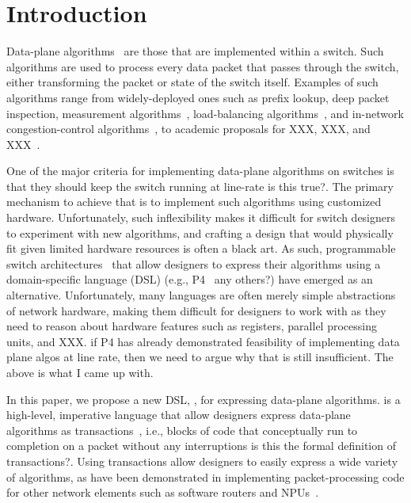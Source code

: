 \section{Introduction}
\label{s:intro}

Data-plane algorithms~\cite{cestan} are those that are implemented within 
a switch. Such algorithms are used to process every data packet that passes
through the switch, either transforming the packet or state of the switch itself.
Examples of such algorithms range from widely-deployed ones such
as prefix lookup, deep
packet inspection, measurement algorithms~\cite{minsketch}, load-balancing
algorithms~\cite{conga}, and in-network congestion-control algorithms~\cite{XXX},
to academic proposals for XXX, XXX, and XXX~\cite{minsketch, codel, pdq}.

One of the major criteria for implementing data-plane algorithms on switches 
is that they should keep the switch running at line-rate \ac{is this true?}.
The primary mechanism to achieve that is to implement such algorithms using 
customized hardware. Unfortunately, such inflexibility makes it difficult
for switch designers to experiment with new algorithms, and crafting a design
that would physically fit given limited hardware resources is often a black art.
As such, programmable switch architectures~\cite{flexpipe, xpliant, rmt}
that allow designers to express their algorithms using a domain-specific 
language (DSL) (e.g., P4~\cite{p4} \ac{any others?}) 
have emerged as an alternative. Unfortunately, many languages are often 
merely simple abstractions of network hardware, 
making them difficult for designers to work with as they need to reason
about hardware features such as registers, parallel processing units, and XXX.
\ac{if P4 has already demonstrated feasibility of implementing data plane
algos at line rate, then we need to argue why that is still insufficient. The 
above is what I came up with.}

In this paper, we propose a new DSL, \pktlanguage, for expressing 
data-plane algorithms. \pktlanguage
is a high-level, imperative language that allow 
designers express data-plane algorithms as transactions~\cite{transactions}, 
i.e., blocks of code that conceptually run to completion on a packet without any
interruptions \ac{is this the formal definition of transactions?}. Using 
transactions allow designers to easily express a wide variety of algorithms,
as have been demonstrated in implementing packet-processing code for 
other network elements such as software routers and NPUs~\cite{click, intel, qdisc}.

